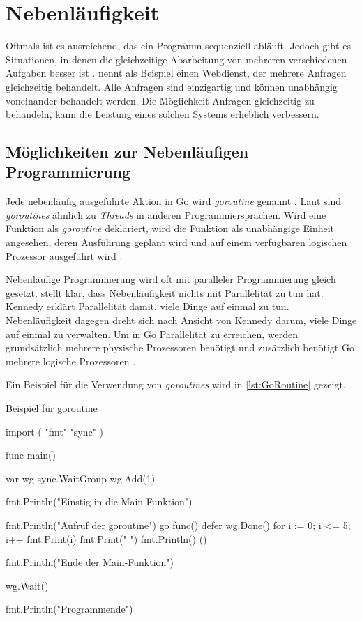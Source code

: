 \chapter{Nebenläufigkeit}
Oftmals ist es ausreichend, das ein Programm sequenziell abläuft.
Jedoch gibt es Situationen, in denen die gleichzeitige Abarbeitung von mehreren verschiedenen Aufgaben besser ist \cite[S.128]{Kennedy.2016}.
\cite[S.128]{Kennedy.2016} nennt als Beispiel einen Webdienst, der mehrere Anfragen gleichzeitig behandelt.
Alle Anfragen sind einzigartig und können unabhängig voneinander behandelt werden.
Die Möglichkeit Anfragen gleichzeitig zu behandeln, kann die Leistung eines solchen Systems erheblich verbessern. 

\section{Möglichkeiten zur Nebenläufigen Programmierung}
Jede nebenläufig ausgeführte Aktion in Go wird \textit{goroutine} genannt \cite[S.352]{Donovan.2016}.
Laut \cite[S.352]{Donovan.2016} sind \textit{goroutines} ähnlich zu \textit{Threads} in anderen Programmiersprachen.
Wird eine Funktion als \textit{goroutine} deklariert, wird die Funktion als unabhängige Einheit angesehen, deren Ausführung geplant wird und auf einem verfügbaren logischen Prozessor ausgeführt wird \cite[S.128]{Kennedy.2016}.

Nebenläufige Programmierung wird oft mit paralleler Programmierung gleich gesetzt. 
\cite[S.131]{Kennedy.2016} stellt klar, dass Nebenläufigkeit nichts mit Parallelität zu tun hat.
Kennedy erklärt Parallelität damit, viele Dinge auf einmal zu tun.
Nebenläufigkeit dagegen dreht sich nach Ansicht von Kennedy darum, viele Dinge auf einmal zu verwalten.
Um in Go Parallelität zu erreichen, werden grundsätzlich mehrere physische Prozessoren benötigt und zusätzlich benötigt Go mehrere logische Prozessoren \cite[S.131]{Kennedy.2016}.

Ein Beispiel für die Verwendung von \textit{goroutines} wird in \autoref{lst:GoRoutine} gezeigt.

\begin{listing}[H]
\caption{Beispiel für goroutine}
\label{lst:GoRoutine}
\begin{GoCode}
import (
    "fmt"
    "sync"
)

func main() {
    var wg sync.WaitGroup
    wg.Add(1)
    
    fmt.Println("Einstig in die Main-Funktion")
    
    fmt.Println("Aufruf der goroutine")
    go func() {
        defer wg.Done()
        for i := 0; i <= 5; i++ {
            fmt.Print(i)
            fmt.Print(" ")
        }
        fmt.Println()
    }()
    
    fmt.Println("Ende der Main-Funktion")
    
    wg.Wait()
    
    fmt.Println("Programmende")
}
\end{GoCode}
\end{listing}

